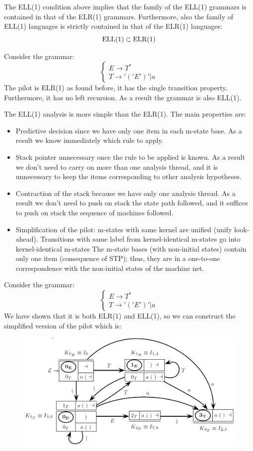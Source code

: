 The ELL(1) condition above implies that the family of the ELL(1) grammars is contained in that of the ELR(1) grammars.
Furthermore, also the family of ELL(1) languages is strictly contained in that of the ELR(1) languages: 
\[\textnormal{ELL(1)} \subset \textnormal{ELR(1)}\]
\begin{example}
    Consider the grammar: 
    \[
    \begin{cases}
        E \rightarrow T^{*} \\
        T \rightarrow '('E')'|a
    \end{cases}
    \]
    The pilot is ELR(1) as found before, it has the single transition property.
    Furthermore, it has no left recursion.
    As a result the grammar is also ELL(1).
\end{example}
The ELL(1) analysis is more simple than the ELR(1). 
The main properties are: 
\begin{itemize}
    \item Predictive decision since we have only one item in each m-state base. 
        As a result we know immediately which rule to apply. 
    \item Stack pointer unnecessary once the rule to be applied is known. 
        As a result we don't need to carry on more than one analysis thread, and it is unnecessary to keep the items corresponding to other analysis hypotheses.
    \item Contraction of the stack because we have only one analysis thread. 
        As a result we don't need to push on stack the state path followed, and it suffices to push on stack the sequence of machines followed. 
    \item Simplification of the pilot: m-states with same kernel are unified (unify look-ahead).
        Transitions with same label from kernel-identical m-states go into kernel-identical m-states
        The m-state bases (with non-initial states) contain only one item (consequence of STP); thus, they are in a one-to-one correspondence with the non-initial states of the machine net. 
\end{itemize}
\begin{example}
    Consider the grammar: 
    \[
    \begin{cases}
        E \rightarrow T^{*} \\
        T \rightarrow '('E')'|a
    \end{cases}
    \]
    We have shown that it is both ELR(1) and ELL(1), so we can construct the simplified version of the pilot which is: 
    \begin{figure}[H]
        \centering
        \includegraphics[width=0.6\linewidth]{images/pil1.png}
    \end{figure}
\end{example}

